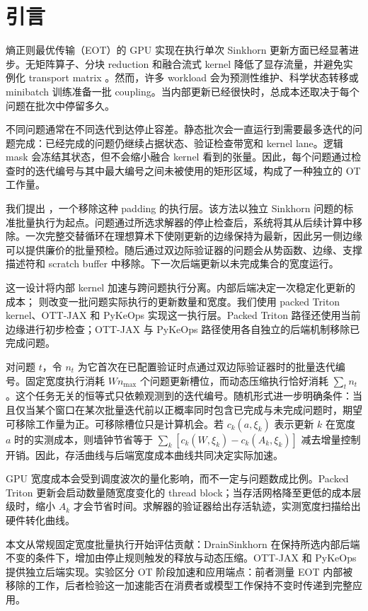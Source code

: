 \section{引言}
\label{sec:introduction}

熵正则最优传输（EOT）的 GPU 实现在执行单次 Sinkhorn 更新方面已经显著进步。无矩阵算子、分块 reduction 和融合流式 kernel 降低了显存流量，并避免实例化 transport matrix \citep{feydy2019sinkhorn,cuturi2022ott}。然而，许多 workload 会为预测性维护、科学状态转移或 minibatch 训练准备一批 coupling。当内部更新已经很快时，总成本还取决于每个问题在批次中停留多久。

不同问题通常在不同迭代到达停止容差。静态批次会一直运行到需要最多迭代的问题完成：已经完成的问题仍继续占据状态、验证检查带宽和 kernel lane。逻辑 mask 会冻结其状态，但不会缩小融合 kernel 看到的张量。因此，每个问题通过检查时的迭代编号与其中最大编号之间未被使用的矩形区域，构成了一种独立的 OT 工作量。

我们提出 \policy{}，一个移除这种 padding 的执行层。该方法以独立 Sinkhorn 问题的标准批量执行为起点。问题通过所选求解器的停止检查后，系统将其从后续计算中移除。一次完整交替循环在理想算术下使刚更新的边缘保持为最新，因此另一侧边缘可以提供廉价的批量预检。随后通过双边际验证器的问题会从势函数、边缘、支撑描述符和 scratch buffer 中移除。下一次后端更新以未完成集合的宽度运行。

这一设计将内部 kernel 加速与跨问题执行分离。内部后端决定一次稳定化更新的成本；\policy{} 则改变一批问题实际执行的更新数量和宽度。我们使用 packed Triton kernel、OTT-JAX 和 PyKeOps 实现这一执行层。Packed Triton 路径还使用当前边缘进行初步检查；OTT-JAX 与 PyKeOps 路径使用各自独立的后端机制移除已完成问题。

对问题 $t$，令 $n_t$ 为它首次在已配置验证时点通过双边际验证器时的批量迭代编号。固定宽度执行消耗 $Wn_{\max}$ 个问题更新槽位，而动态压缩执行恰好消耗 $\sum_t n_t$。这个任务无关的恒等式只依赖观测到的迭代编号。随机形式进一步明确条件：当且仅当某个窗口在某次批量迭代前以正概率同时包含已完成与未完成问题时，期望可移除工作量为正。可移除槽位只是计算机会。若 $c_k(a,\xi_k)$ 表示更新 $k$ 在宽度 $a$ 时的实测成本，则墙钟节省等于 $\sum_k[c_k(W,\xi_k)-c_k(A_k,\xi_k)]$ 减去增量控制开销。因此，存活曲线与后端宽度成本曲线共同决定实际加速。

GPU 宽度成本会受到调度波次的量化影响，而不一定与问题数成比例。Packed Triton 更新会启动数量随宽度变化的 thread block；当存活网格降至更低的成本层级时，缩小 $A_k$ 才会节省时间。求解器的验证器给出存活轨迹，实测宽度扫描给出硬件转化曲线。

本文从常规固定宽度批量执行开始评估贡献：DrainSinkhorn 在保持所选内部后端不变的条件下，增加由停止规则触发的释放与动态压缩。OTT-JAX 和 PyKeOps 提供独立后端实现。实验区分 OT 阶段加速和应用端点：前者测量 EOT 内部被移除的工作，后者检验这一加速能否在消费者或模型工作保持不变时传递到完整应用。

